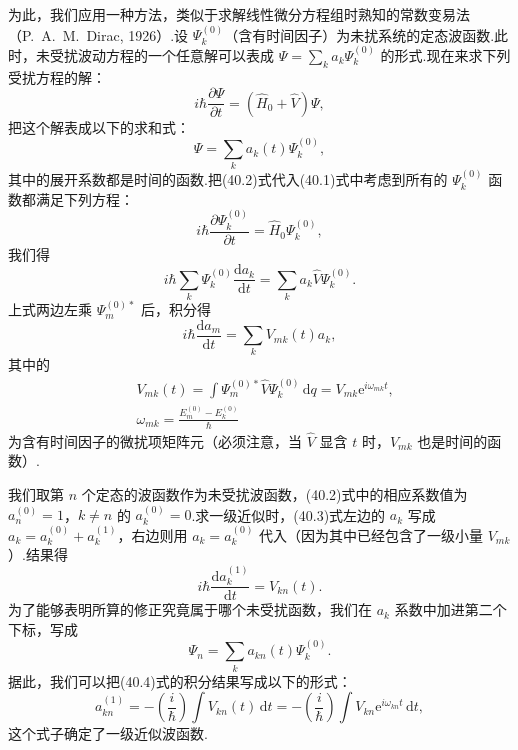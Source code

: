 为此，我们应用一种方法，类似于求解线性微分方程组时熟知的常数变易法（P.~A.~M.~Dirac, 1926）.设 $\varPsi_k^{(0)}$（含有时间因子）为未扰系统的定态波函数.此时，未受扰波动方程的一个任意解可以表成 $\varPsi=\sum_k a_k\varPsi_k^{(0)}$ 的形式.现在来求下列受扰方程的解：
\begin{equation}
  i\hbar\frac{\partial\varPsi}{\partial t}=\left(\hat{H}_0+\hat{V}\right)\varPsi,
\end{equation}
把这个解表成以下的求和式：
\begin{equation}
  \varPsi=\sum_k a_k(t)\varPsi_k^{(0)},
\end{equation}
其中的展开系数都是时间的函数.把(40.2)式代入(40.1)式中考虑到所有的 $\varPsi_k^{(0)}$ 函数都满足下列方程：
\begin{equation*}
  i\hbar\frac{\partial\varPsi_k^{(0)}}{\partial t}=\hat{H}_0\varPsi_k^{(0)},
\end{equation*}
我们得
\begin{equation*}
  i\hbar\sum_k\varPsi_k^{(0)}\frac{\mathrm{d}a_k}{\mathrm{d}t}
  =\sum_k a_k\hat{V}\varPsi_k^{(0)}.
\end{equation*}
上式两边左乘 $\varPsi_m^{(0)*}$ 后，积分得
\begin{equation}
  i\hbar\frac{\mathrm{d}a_m}{\mathrm{d}t}=\sum_k V_{mk}(t)a_k,
\end{equation}
其中的
\begin{equation*}
\begin{aligned}
  &V_{mk}(t)=\int\varPsi_m^{(0)*}\hat{V}\varPsi_k^{(0)}\,\mathrm{d}q
  =V_{mk}\mathrm{e}^{i\omega_{mk}t},\\
  &\omega_{mk}=\frac{E_m^{(0)}-E_k^{(0)}}{\hbar}
\end{aligned}
\end{equation*}
为含有时间因子的微扰项矩阵元（必须注意，当 $\hat{V}$ 显含 $t$ 时，$V_{mk}$ 也是时间的函数）.

我们取第 $n$ 个定态的波函数作为未受扰波函数，(40.2)式中的相应系数值为 $a_n^{(0)}=1$，$k\neq n$ 的 $a_k^{(0)}=0$.求一级近似时，(40.3)式左边的 $a_k$ 写成 $a_k=a_k^{(0)}+a_k^{(1)}$，右边则用 $a_k=a_k^{(0)}$ 代入（因为其中已经包含了一级小量 $V_{mk}$）.结果得
\begin{equation}
  i\hbar\frac{\mathrm{d}a_k^{(1)}}{\mathrm{d}t}=V_{kn}(t).
\end{equation}
为了能够表明所算的修正究竟属于哪个未受扰函数，我们在 $a_k$ 系数中加进第二个下标，写成
\begin{equation*}
  \varPsi_n=\sum_k a_{kn}(t)\varPsi_k^{(0)}.
\end{equation*}
据此，我们可以把(40.4)式的积分结果写成以下的形式：
\begin{equation}
  a_{kn}^{(1)}=-\left(\frac{i}{\hbar}\right)\int V_{kn}(t)\,\mathrm{d}t
  =-\left(\frac{i}{\hbar}\right)\int V_{kn}\mathrm{e}^{i\omega_{kn}t}\,\mathrm{d}t,
\end{equation}
这个式子确定了一级近似波函数.

